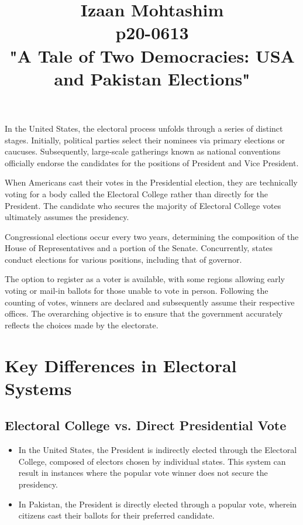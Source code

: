\documentclass{article}
\title{Izaan Mohtashim \\ p20-0613\\"A Tale of Two Democracies: USA and Pakistan Elections"}
\renewcommand{\maketitle}{
  \begin{center}
    \huge\bfseries\thetitle
  \end{center}
}
\begin{document}
\maketitle

In the United States, the electoral process unfolds through a series of distinct stages. Initially, political parties select their nominees via primary elections or caucuses. Subsequently, large-scale gatherings known as national conventions officially endorse the candidates for the positions of President and Vice President.

When Americans cast their votes in the Presidential election, they are technically voting for a body called the Electoral College rather than directly for the President. The candidate who secures the majority of Electoral College votes ultimately assumes the presidency.

Congressional elections occur every two years, determining the composition of the House of Representatives and a portion of the Senate. Concurrently, states conduct elections for various positions, including that of governor.

The option to register as a voter is available, with some regions allowing early voting or mail-in ballots for those unable to vote in person. Following the counting of votes, winners are declared and subsequently assume their respective offices. The overarching objective is to ensure that the government accurately reflects the choices made by the electorate.

\section{Key Differences in Electoral Systems}

\subsection{Electoral College vs. Direct Presidential Vote}
\begin{itemize}
    \item In the United States, the President is indirectly elected through the Electoral College, composed of electors chosen by individual states. This system can result in instances where the popular vote winner does not secure the presidency.
    \item In Pakistan, the President is directly elected through a popular vote, wherein citizens cast their ballots for their preferred candidate.
\end{itemize}
\end{document}
